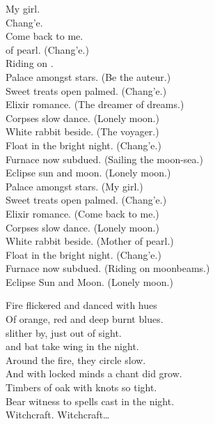 My girl. \\
Chang'e. \\
Come back to me. \\
 of pearl. (Chang'e.) \\
Riding on . \\

Palace amongst stars. (Be the auteur.) \\
Sweet treats open palmed. (Chang'e.) \\
Elixir romance. (The dreamer of dreams.) \\
Corpses slow dance. (Lonely moon.) \\
White rabbit beside. (The voyager.) \\
Float in the bright night. (Chang'e.) \\
Furnace now subdued. (Sailing the moon-sea.) \\
Eclipse sun and moon. (Lonely moon.) \\

Palace amongst stars. (My girl.) \\
Sweet treats open palmed. (Chang'e.) \\
Elixir romance. (Come back to me.) \\
Corpses slow dance. (Lonely moon.) \\
White rabbit beside. (Mother of pearl.) \\
Float in the bright night. (Chang'e.) \\
Furnace now subdued. (Riding on moonbeams.) \\
Eclipse Sun and Moon. (Lonely moon.) \\


Fire flickered and danced with hues \\
Of orange, red and deep burnt blues. \\
 slither by, just out of sight. \\
 and bat take wing in the night. \\
Around the fire, they circle slow. \\
And with locked minds a chant did grow. \\
Timbers of oak with knots so tight. \\
Bear witness to spells cast in the night. \\

Witchcraft. Witchcraft… \\

